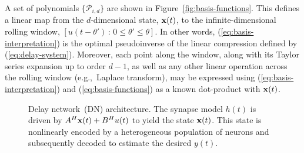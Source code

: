 A set of polynomials $\{ \mathcal{P}_{i, d} \}$ are shown in Figure~\ref{fig:basis-functions}.
This defines a linear map from the $d$-dimensional state, $\mathbf{x}(t)$, to the infinite-dimensional rolling window, $[ u(t - \theta') \,:\, 0 \le \theta' \le \theta ]$.
In other words, (\ref{eq:basis-interpretation}) is the optimal pseudoinverse of the linear compression defined by (\ref{eq:delay-system}).
Moreover, each point along the window, along with its Taylor series expansion up to order $d-1$, as well as any other linear operation across the rolling window (e.g.,~Laplace transform), may be expressed using (\ref{eq:basis-interpretation}) and (\ref{eq:basis-functions}) as a known dot-product with $\mathbf{x}(t)$.

\begin{figure}
\centering
  \caption{ \label{fig:delay-architecture}
    Delay network~(DN) architecture.
    The synapse model $h(t)$ is driven by $A^H \mathbf{x}(t) + B^H u(t)$ to yield the state $\mathbf{x}(t)$. 
    This state is nonlinearly encoded by a heterogeneous population of neurons and subsequently decoded to estimate the desired $y(t)$.
  } 
\end{figure}

